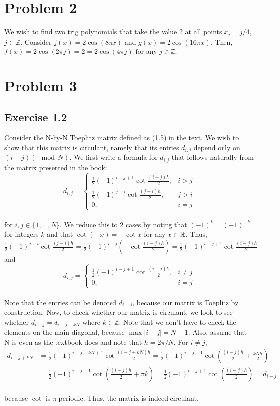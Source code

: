\documentclass{article}
\begin{document}
\section{Problem 2} 
We wish to find two trig polynomials that take the value 2 at all points $x_j=j/4$, $j\in\mathbb{Z}$. Consider $f(x)=2\cos(8\pi x)$ and $g(x)=2\cos(16\pi x)$. Then, $f(x)=2\cos(2\pi j)=2=2\cos(4\pi j)$ for any $j\in\mathbb{Z}$.
\section{Problem 3}
\subsection{Exercise 1.2}
Consider the N-by-N Toeplitz matrix defined as (1.5) in the text. We wish to show that this matrix is circulant, namely that its entries $d_{i,j}$ depend only on $(i-j)(\mod N)$. We first write a formula for $d_{i,j}$ that follows naturally from the matrix presented in the book:
\[
d_{i,j} = \begin{cases}
\frac{1}{2}(-1)^{i-j+1}\cot\frac{(i-j)h}{2}, &i>j\\
\frac{1}{2}(-1)^{j-i}\cot\frac{(j-i)h}{2},& j>i\\
0,& i=j
\end{cases}
\]\\
for $i,j\in\{1,...,N\}$. We reduce this to 2 cases by noting that $(-1)^k=(-1)^{-k}$ for integers $k$ and that $\cot(-x)=-\cot x$ for any $x\in\mathbb{R}$. Thus, $\frac{1}{2}(-1)^{j-i}\cot\frac{(j-i)h}{2}=\frac{1}{2}(-1)^{i-j}(-\cot\frac{(i-j)h}{2})=\frac{1}{2}(-1)^{i-j+1}\cot\frac{(i-j)h}{2}$ and
\[
d_{i,j} = \begin{cases}
\frac{1}{2}(-1)^{i-j+1}\cot\frac{(i-j)h}{2}, &i\neq j\\
0,& i=j
\end{cases}
\]\\
Note that the entries can be denoted $d_{i-j}$, because our matrix is Toeplitz by construction. Now, to check whether our matrix is circulant, we look to see whether $d_{i-j}=d_{i-j+kN}$ where $k\in\mathbb{Z}$. Note that we don't have to check the elements on the main diagonal, because $\max{|i-j|}=N-1$. Also, assume that N is even as the textbook does and note that $h=2\pi/N$. For $i\neq j$, 
\[
\begin{split}
d_{i-j+kN}&=\frac{1}{2}(-1)^{i-j+kN+1}\cot\frac{(i-j+kN)h}{2}=\frac{1}{2}(-1)^{i-j+1}\cot(\frac{(i-j)h}{2}+\frac{kNh}{2})\\&=\frac{1}{2}(-1)^{i-j+1}\cot(\frac{(i-j)h}{2}+\pi k)=\frac{1}{2}(-1)^{i-j+1}\cot(\frac{(i-j)h}{2})=d_{i-j}
\end{split}
\]\\
because $\cot$ is $\pi$-periodic. Thus, the matrix is indeed circulant.
\end{document}
